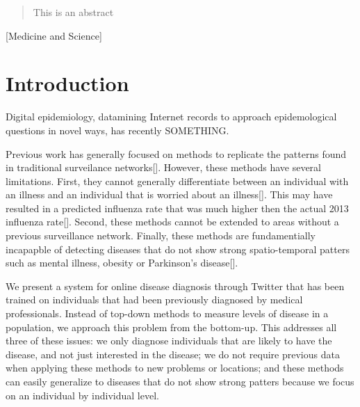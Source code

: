 \documentclass{acm_proc_article-sp}
\begin{document}
\maketitle
\begin{abstract}
This is an abstract
\end{abstract}

[Medicine and Science]



\section{Introduction}
Digital epidemiology, datamining Internet records to approach epidemological questions in novel ways, has recently SOMETHING.  

Previous work has generally focused on methods to replicate the patterns found in traditional surveilance networks[]. However, these methods have several limitations. First, they cannot generally differentiate between an individual with an illness and an individual that is worried about an illness[]. This may have resulted in a predicted influenza rate that was much higher then the actual 2013 influenza rate[]. Second, these methods cannot be extended to areas without a previous surveillance network. Finally, these methods are fundamentially incapapble of detecting diseases that do not show strong spatio-temporal patters such as mental illness, obesity or Parkinson's disease[]. 

We present a system for online disease diagnosis through Twitter that has been trained on individuals that had been previously diagnosed by medical professionals. Instead of top-down methods to measure levels of disease in a population, we approach this problem from the bottom-up. This addresses all three of these issues: we only diagnose individuals that are likely to have the disease, and not just interested in the disease; we do not require previous data when applying these methods to new problems or locations; and these methods can easily generalize to diseases that do not show strong patters because we focus on an individual by individual level.
\end{document}
